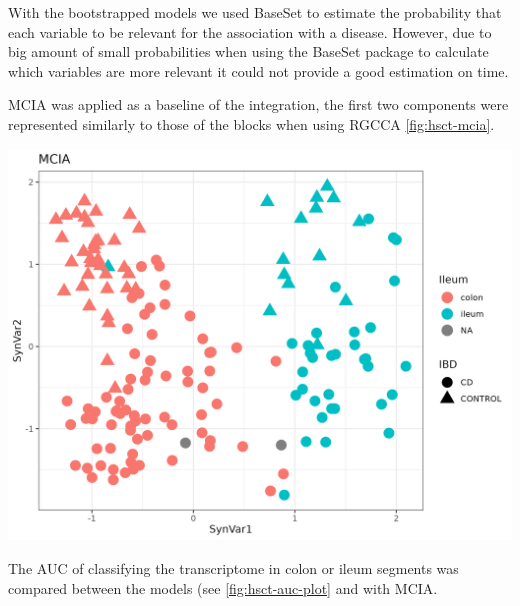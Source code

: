 \documentclass[
  12pt,
  a4paper,
  twoside,
  openright]{book}
\let\origfigure\figure
\let\endorigfigure\endfigure
\renewenvironment{figure}[1][2] {
    \expandafter\origfigure\expandafter[!htp]
} {
    \endorigfigure
}
\begin{document}
With the bootstrapped models we used BaseSet to estimate the probability that each variable to be relevant for the association with a disease.
However, due to big amount of small probabilities when using the BaseSet package to calculate which variables are more relevant it could not provide a good estimation on time.

MCIA was applied as a baseline of the integration, the first two components were represented similarly to those of the blocks when using RGCCA \ref{fig:hsct-mcia}.

\begin{figure}
\includegraphics[width=1\linewidth]{images/hsct-mcia} \caption[MCIA dimensions on the HSCT dataset.]{MCIA dimensions on the HSCT dataset. MCIA first two synthetic variables. In red circles the colon and in blue triangles the ileum.}\label{fig:hsct-mcia}
\end{figure}

The AUC of classifying the transcriptome in colon or ileum segments was compared between the models (see \ref{fig:hsct-auc-plot} and with MCIA.
\end{document}
